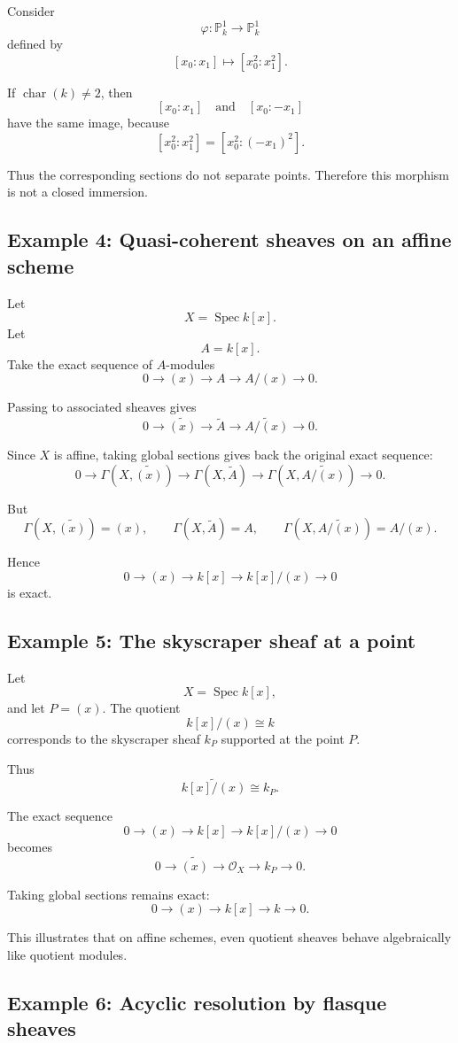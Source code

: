 \documentclass[12pt,a4paper]{article}
\theoremstyle{notespace}
\begin{document}
Consider
\[
\varphi:\mathbb P^1_k\to \mathbb P^1_k
\]
defined by
\[
[x_0:x_1]\mapsto [x_0^2:x_1^2].
\]

If \(\operatorname{char}(k)\neq 2\), then
\[
[x_0:x_1]
\quad\text{and}\quad
[x_0:-x_1]
\]
have the same image, because
\[
[x_0^2:x_1^2]=[x_0^2:(-x_1)^2].
\]

Thus the corresponding sections do not separate points. Therefore this morphism is not a closed immersion.

\subsection*{Example 4: Quasi-coherent sheaves on an affine scheme}

Let
\[
X=\operatorname{Spec}k[x].
\]
Let
\[
A=k[x].
\]
Take the exact sequence of \(A\)-modules
\[
0\to (x)\to A\to A/(x)\to 0.
\]

Passing to associated sheaves gives
\[
0\to \widetilde{(x)}
\to \widetilde A
\to \widetilde{A/(x)}
\to 0.
\]

Since \(X\) is affine, taking global sections gives back the original exact sequence:
\[
0\to \Gamma(X,\widetilde{(x)})
\to \Gamma(X,\widetilde A)
\to \Gamma(X,\widetilde{A/(x)})
\to 0.
\]

But
\[
\Gamma(X,\widetilde{(x)})=(x),
\qquad
\Gamma(X,\widetilde A)=A,
\qquad
\Gamma(X,\widetilde{A/(x)})=A/(x).
\]

Hence
\[
0\to (x)\to k[x]\to k[x]/(x)\to 0
\]
is exact.

\subsection*{Example 5: The skyscraper sheaf at a point}

Let
\[
X=\operatorname{Spec}k[x],
\]
and let \(P=(x)\). The quotient
\[
k[x]/(x)\cong k
\]
corresponds to the skyscraper sheaf \(k_P\) supported at the point \(P\).

Thus
\[
\widetilde{k[x]/(x)}\cong k_P.
\]

The exact sequence
\[
0\to (x)\to k[x]\to k[x]/(x)\to 0
\]
becomes
\[
0\to \widetilde{(x)}
\to \mathcal O_X
\to k_P
\to 0.
\]

Taking global sections remains exact:
\[
0\to (x)\to k[x]\to k\to 0.
\]

This illustrates that on affine schemes, even quotient sheaves behave algebraically like quotient modules.

\subsection*{Example 6: Acyclic resolution by flasque sheaves}
\end{document}
